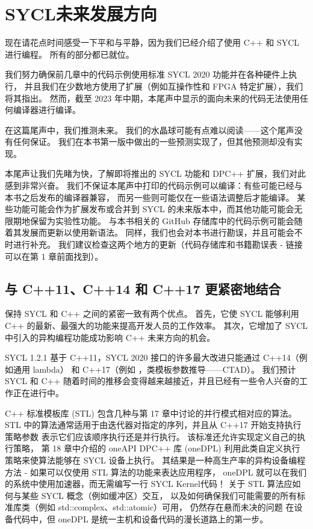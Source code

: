 \section{SYCL未来发展方向}
现在请花点时间感受一下平和与平静，因为我们已经介绍了使用 C++ 和 SYCL 进行编程。 所有的部分都已就位。

我们努力确保前几章中的代码示例使用标准 SYCL 2020 功能并在各种硬件上执行，
并且我们在少数地方使用了扩展（例如互操作性和 FPGA 特定扩展），我们将其指出。 
然而，截至 2023 年中期，本尾声中显示的面向未来的代码无法使用任何编译器进行编译。

在这篇尾声中，我们推测未来。 我们的水晶球可能有点难以阅读——这个尾声没有任何保证。 
我们在本书第一版中做出的一些预测实现了，但其他预测却没有实现。

本尾声让我们先睹为快，了解即将推出的 SYCL 功能和 DPC++ 扩展，我们对此感到非常兴奋。 
我们不保证本尾声中打印的代码示例可以编译：有些可能已经与本书之后发布的编译器兼容，
而另一些则可能仅在一些语法调整后才能编译。 
某些功能可能会作为扩展发布或合并到 SYCL 的未来版本中，而其他功能可能会无限期地保留为实验性功能。 
与本书相关的 GitHub 存储库中的代码示例可能会随着其发展而更新以使用新语法。 
同样，我们也会对本书进行勘误，并且可能会不时进行补充。 
我们建议检查这两个地方的更新（代码存储库和书籍勘误表 - 链接可以在第 1 章前面找到）。

\subsection{与 C++11、C++14 和 C++17 更紧密地结合}
保持 SYCL 和 C++ 之间的紧密一致有两个优点。 
首先，它使 SYCL 能够利用 C++ 的最新、最强大的功能来提高开发人员的工作效率。 
其次，它增加了 SYCL 中引入的异构编程功能成功影响 C++ 未来方向的机会。

SYCL 1.2.1 基于 C++11，SYCL 2020 接口的许多最大改进只能通过 C++14（例如通用 lambda）
和 C++17（例如 ，类模板参数推导——CTAD）。 
我们预计 SYCL 和 C++ 随着时间的推移会变得越来越接近，并且已经有一些令人兴奋的工作正在进行中。

C++ 标准模板库 (STL) 包含几种与第 17 章中讨论的并行模式相对应的算法。
STL 中的算法通常适用于由迭代器对指定的序列，并且从 C++17 开始支持执行策略参数 表示它们应该顺序执行还是并行执行。 
该标准还允许实现定义自己的执行策略，
第 18 章中介绍的 oneAPI DPC++ 库 (oneDPL) 利用此类自定义执行策略来使算法能够在 SYCL 设备上执行。 
其结果是一种高生产率的异构设备编程方法 - 如果可以仅使用 STL 算法的功能来表达应用程序，
oneDPL 就可以在我们的系统中使用加速器，而无需编写一行 SYCL Kernel代码！ 
关于 STL 算法应如何与某些 SYCL 概念（例如缓冲区）交互，
以及如何确保我们可能需要的所有标准库类（例如 std::complex、std::atomic）可用，
仍然存在悬而未决的问题 在设备代码中，但 oneDPL 是统一主机和设备代码的漫长道路上的第一步。

